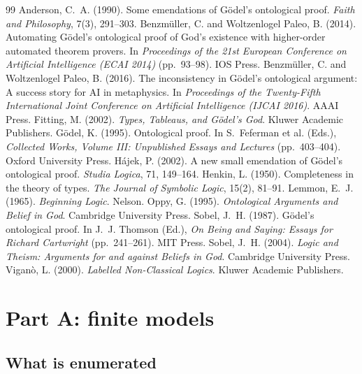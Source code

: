 \documentclass{situationist-preprint}
\begin{document}
\begin{thebibliography}{99}\small
{} Anderson, C.~A. (1990). Some emendations of Gödel's ontological proof. \emph{Faith and Philosophy}, 7(3), 291--303.
 Benzmüller, C. and Woltzenlogel Paleo, B. (2014). Automating Gödel's ontological proof of God's existence with higher-order automated theorem provers. In \emph{Proceedings of the 21st European Conference on Artificial Intelligence (ECAI 2014)} (pp.~93--98). IOS Press.
 Benzmüller, C. and Woltzenlogel Paleo, B. (2016). The inconsistency in Gödel's ontological argument: A success story for AI in metaphysics. In \emph{Proceedings of the Twenty-Fifth International Joint Conference on Artificial Intelligence (IJCAI 2016)}. AAAI Press.
 Fitting, M. (2002). \emph{Types, Tableaus, and Gödel's God}. Kluwer Academic Publishers.
 Gödel, K. (1995). Ontological proof. In S.~Feferman et al. (Eds.), \emph{Collected Works, Volume III: Unpublished Essays and Lectures} (pp.~403--404). Oxford University Press.
 Hájek, P. (2002). A new small emendation of Gödel's ontological proof. \emph{Studia Logica}, 71, 149--164.
 Henkin, L. (1950). Completeness in the theory of types. \emph{The Journal of Symbolic Logic}, 15(2), 81--91.
 Lemmon, E.~J. (1965). \emph{Beginning Logic}. Nelson.
 Oppy, G. (1995). \emph{Ontological Arguments and Belief in God}. Cambridge University Press.
 Sobel, J.~H. (1987). Gödel's ontological proof. In J.~J. Thomson (Ed.), \emph{On Being and Saying: Essays for Richard Cartwright} (pp.~241--261). MIT Press.
 Sobel, J.~H. (2004). \emph{Logic and Theism: Arguments for and against Beliefs in God}. Cambridge University Press.
 Viganò, L. (2000). \emph{Labelled Non-Classical Logics}. Kluwer Academic Publishers.
\end{thebibliography}

\clearpage
\appendix
\section{Part A: finite models}\label{app:models}

\subsection{What is enumerated}
\end{document}
